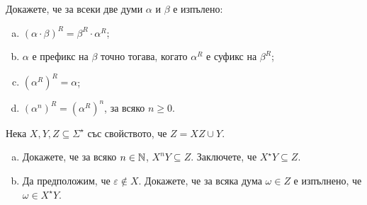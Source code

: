 \begin{problem}
  Докажете, че за всеки две думи $\alpha$ и $\beta$ е изпълено:
  \begin{enumerate}[a)]
  \item 
    $(\alpha\cdot\beta)^R = \beta^R\cdot\alpha^R$;
  \item
    $\alpha$ е префикс на $\beta$ точно тогава, когато $\alpha^R$ е суфикс на $\beta^R$;
  \item
    $(\alpha^R)^R = \alpha$;
  \item
    $(\alpha^n)^R = (\alpha^R)^n$, за всяко $n \geq 0$.
  \end{enumerate}
\end{problem}

\begin{problem}
  Нека $X, Y, Z \subseteq \Sigma^\star$ със свойството, че $Z = XZ \cup Y$.
  \begin{enumerate}[a)]
  \item 
    Докажете, че за всяко $n \in \mathbb{N}$, $X^nY \subseteq Z$.
    Заключете, че $X^\star Y \subseteq Z$.
  \item
    Да предположим, че $\varepsilon \not\in X$.
    Докажете, че за всяка дума $\omega \in Z$ е изпълнено, че $\omega \in X^\star Y$.
  \end{enumerate}
\end{problem}


